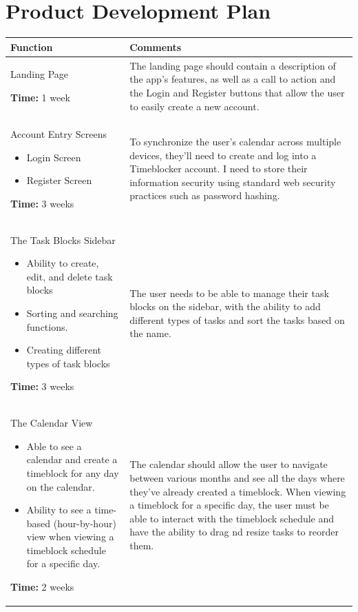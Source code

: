 \documentclass[12pt]{report}
\begin{document}
\section*{Product Development Plan}
\def\arraystretch{1.5}
\begin{xltabular}{\textwidth}{|X|X|}
	\hline
	Function
	& Comments
	\\\hline
	Landing Page

	\medskip

	\textbf{Time:} 1 week
	&
	The landing page should contain a description of the app's features, as well as a call to action and the Login and Register buttons that allow the user to easily create a new account.
	\\\hline
	Account Entry Screens
	\begin{itemize}
		\item Login Screen
		\item Register Screen
	\end{itemize}
	\textbf{Time:} 3 weeks
	&
	To synchronize the user's calendar across multiple devices, they’ll need to create and log into a Timeblocker account. I need to store their information security using standard web security practices such as password hashing.
	\\\hline
	The Task Blocks Sidebar
	\begin{itemize}
		\item Ability to create, edit, and delete task blocks
		\item Sorting and searching functions.
		\item Creating different types of task blocks
	\end{itemize}
	\textbf{Time:} 3 weeks
	&
	The user needs to be able to manage their task blocks on the sidebar, with the ability to add different types of tasks and sort the tasks based on the name.
	\\\hline
	The Calendar View
	\begin{itemize}
		\item Able to see a calendar and create a timeblock for any day on the calendar.
		\item Ability to see a time-based (hour-by-hour) view when viewing a timeblock schedule for a specific day.
	\end{itemize}
	\textbf{Time:} 2 weeks
	&
	The calendar should allow the user to navigate between various months and see all the days where they've already created a timeblock. When viewing a timeblock for a specific day, the user must be able to interact with the timeblock schedule and have the ability to drag nd resize tasks to reorder them.
	\\\hline
\end{xltabular}

\newpage
\end{document}
